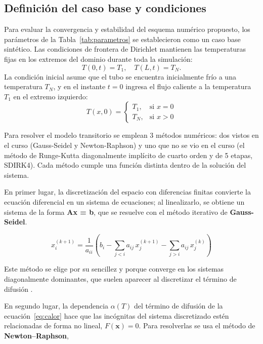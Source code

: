 \documentclass[final,5p,times,twocolumn,authoryear,11pt]{elsarticle}
\begin{document}
\subsection{Definición del caso base y condiciones}
Para evaluar la convergencia y estabilidad del esquema numérico propuesto, los parámetros de la Tabla~\ref{tab:parametros} se establecieron como un caso base sintético. Las condiciones de frontera de Dirichlet mantienen las temperaturas fijas en los extremos del dominio durante toda la simulación:
\begin{equation}
T(0,t) = T_1, \quad T(L,t) = T_N.
\end{equation}
La condición inicial asume que el tubo se encuentra inicialmente frío a una temperatura $T_N$, y en el instante $t=0$ ingresa el flujo caliente a la temperatura $T_1$ en el extremo izquierdo:
\begin{equation}
T(x,0) = \begin{cases} 
T_1, & \text{si } x = 0 \\ 
T_N, & \text{si } x > 0 
\end{cases}
\end{equation}



Para resolver el modelo transitorio se emplean 3 métodos numéricos: dos vistos en el curso (Gauss-Seidel y Newton-Raphson) y uno que no se vio en el curso (el método de Runge-Kutta diagonalmente implícito de cuarto orden y de 5 etapas, SDIRK4). Cada método cumple una función distinta dentro de la solución del sistema.

En primer lugar, la discretización del espacio con diferencias finitas convierte la ecuación diferencial en un sistema de ecuaciones; al linealizarlo, se obtiene un sistema de la forma \textbf{Ax = b}, que se resuelve con el método iterativo de \textbf{Gauss-Seidel}.

\begin{equation}
x_i^{(k+1)} = \frac{1}{a_{ii}} \left( b_i - \sum_{j<i} a_{ij}\, x_j^{(k+1)} - \sum_{j>i} a_{ij}\, x_j^{(k)} \right)
\label{eq:gauss_seidel}
\end{equation}

\noindent Este método se elige por su sencillez y porque converge en los sistemas diagonalmente dominantes, que suelen aparecer al discretizar el término de difusión \citep{Zhang2015}.

En segundo lugar, la dependencia $\alpha(T)$ del término de difusión de la ecuación~\eqref{eq:calor} hace que las incógnitas del sistema discretizado estén relacionadas de forma no lineal, $F(\mathbf{x}) = 0$. Para resolverlas se usa el método de \textbf{Newton--Raphson},
\end{document}
